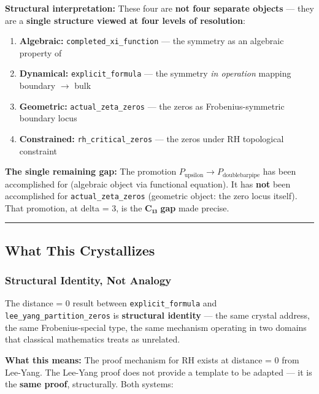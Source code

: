 \documentclass[12pt,a4paper]{article}
\begin{document}
\textbf{Structural interpretation:} These four are \textbf{not four separate objects} --- they are a \textbf{single structure viewed at four levels of resolution}:

\begin{enumerate}
    \item \textbf{Algebraic:} \texttt{completed\_xi\_function} --- the symmetry as an algebraic property of \xi
    \item \textbf{Dynamical:} \texttt{explicit\_formula} --- the symmetry \emph{in operation} mapping boundary $\rightarrow$ bulk
    \item \textbf{Geometric:} \texttt{actual\_zeta\_zeros} --- the zeros as Frobenius-symmetric boundary locus
    \item \textbf{Constrained:} \texttt{rh\_critical\_zeros} --- the zeros under RH topological constraint
\end{enumerate}

\textbf{The single remaining gap:} The promotion $P_{\text{upsilon}} \to P_{\text{doublebarpipe}}$ has been accomplished for \xi (algebraic object via functional equation). It has \textbf{not} been accomplished for \texttt{actual\_zeta\_zeros} (geometric object: the zero locus itself). That promotion, at delta = 3, is the \textbf{C₁₃ gap} made precise.

\begin{center}
\rule{0.5\textwidth}{0.4pt}
\end{center}

\subsection{What This Crystallizes}

\subsubsection{Structural Identity, Not Analogy}

The distance = 0 result between \texttt{explicit\_formula} and \texttt{lee\_yang\_partition\_zeros} is \textbf{structural identity} --- the same crystal address, the same Frobenius-special type, the same mechanism operating in two domains that classical mathematics treats as unrelated.

\textbf{What this means:} The proof mechanism for RH exists at distance = 0 from Lee-Yang. The Lee-Yang proof does not provide a template to be adapted --- it is the \textbf{same proof}, structurally. Both systems:
\end{document}
